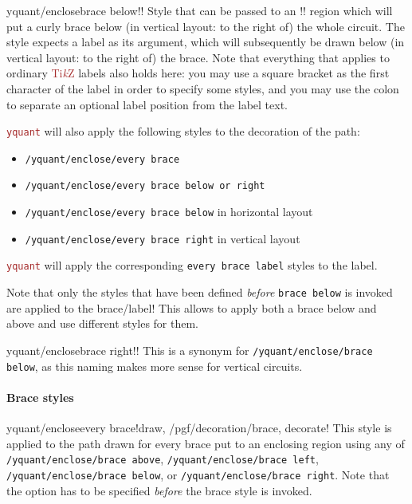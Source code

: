 \documentclass{scrartcl}
\makeatletter
\let\unpatched@minted@inline@iii=\minted@inline@iii%
\def\patched@minted@inline@iii#1{%
      \unpatched@minted@inline@iii{#1}%
      \par%
      \endgroup\egroup\nopagebreak\vskip-\parskip\nopagebreak%
      \noindent\ignorespaces%
   }
\def\patch@mintinline{%
      \let\minted@inline@iii=\patched@minted@inline@iii%
   }
\let\unpatched@RobustMintInlineProcess@ii=\RobustMintInlineProcess@ii
\def\patched@RobustMintInlineProcess@ii#1{%
      \unpatched@RobustMintInlineProcess@ii{#1}%
      \par%
      \endgroup\egroup\nopagebreak\vskip-\parskip\nopagebreak%
      \noindent\ignorespaces%
   }
\def\patch@mintinline{%
      \let\RobustMintInlineProcess@ii=\patched@RobustMintInlineProcess@ii%
   }
\newenvironment{option*}[3][]{\ifhmode\par\fi\addvspace{5mm}%
   \vbox\bgroup\begingroup%
      \patch@mintinline%
      \raggedleft%
      \hspace*{-1cm}%
      \phantomsection\label{yquant:/#2/#3}%
      \texttt{\ifstrempty{#1}\relax{\compat{#1}}\textcolor{gray}{/#2/}\textcolor{mintgreen}{#3}}\hfill default: %
      \tex}{\par\addvspace{5mm}}
\def\TikZ{\textcolor{brown}{Ti\textit kZ}}
\def\pkg#1{\textcolor{brown}{\texttt{#1}}}
\def\ttlink{\link\texttt}
\def\Yquant{\pkg{yquant}}
\makeatother
\begin{document}
            \begin{option*}{yquant/enclose}{brace below}!!
               Style that can be passed to an \tex!\encloseall! region which will put a curly brace below (in vertical layout: to the right of) the whole circuit.
               The style expects a label as its argument, which will subsequently be drawn below (in vertical layout: to the right of) the brace.
               Note that everything that applies to ordinary \TikZ{} labels also holds here: you may use a square bracket as the first character of the label in order to specify some styles, and you may use the colon to separate an optional label position from the label text.

               \Yquant{} will also apply the following styles to the decoration of the path:
               \begin{itemize}
                  \item \ttlink{/yquant/enclose/every brace}
                  \item \ttlink{/yquant/enclose/every brace below or right}
                  \item \ttlink{/yquant/enclose/every brace below} in horizontal layout
                  \item \ttlink{/yquant/enclose/every brace right} in vertical layout
               \end{itemize}

               \Yquant{} will apply the corresponding \texttt{every brace label} styles to the label.

               Note that only the styles that have been defined \emph{before} \texttt{brace below} is invoked are applied to the brace/label!
               This allows to apply both a brace below and above and use different styles for them.
            \end{option*}

            \begin{option*}{yquant/enclose}{brace right}!!
               This is a synonym for \ttlink{/yquant/enclose/brace below}, as this naming makes more sense for vertical circuits.
            \end{option*}

            \clearpage
            \paragraph{Brace styles}\leavevmode
               \begin{option*}{yquant/enclose}{every brace}!draw, /pgf/decoration/brace, decorate!
                  This style is applied to the path drawn for every brace put to an enclosing region using any of \ttlink{/yquant/enclose/brace above}, \ttlink{/yquant/enclose/brace left}, \ttlink{/yquant/enclose/brace below}, or \ttlink{/yquant/enclose/brace right}.
                  Note that the option has to be specified \emph{before} the brace style is invoked.
               \end{option*}
\end{document}
